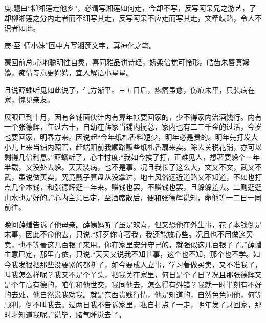 
\begin{parag}
    \begin{note}庚:题曰“柳湘莲走他乡”，必谓写湘莲如何走，今却不写，反写阿呆兄之游艺，了却柳湘莲之分内走者而不细写其走，反写阿呆不应走而写其走，文牵歧路，令人不识者如此。\end{note}
\end{parag}


\begin{parag}
    \begin{note}庚:至“情小妹”回中方写湘莲文字，真神化之笔。\end{note}
\end{parag}


\begin{parag}
    \begin{note}蒙回前总:心地聪明性自灵，喜同雅品讲诗经，娇柔倍觉可怜形。皓齿朱唇真嬝嬝，痴情专意更娉娉，宜人解语小星星。\end{note}
\end{parag}


\begin{parag}
    且说薛蟠听见如此说了，气方渐平。三五日后，疼痛虽愈，伤痕未平，只装病在家，愧见亲友。
\end{parag}


\begin{parag}
    展眼已到十月，因有各铺面伙计内有算年帐要回家的，少不得家内治酒饯行。内有一个张德辉，年过六十，自幼在薛家当铺内揽总，家内也有二三千金的过活，今岁也要回家，明春方来。因说起“今年纸札香料短少，明年必是贵的。明年先打发大小儿上来当铺内照管，赶端阳前我顺路贩些纸札香扇来卖。除去关税花销，亦可以剩得几倍利息。”薛蟠听了，心中忖度:“我如今挨了打，正难见人，想著要躲个一年半载，又没处去躲。天天装病，也不是事。况且我长了这么大，文又不文，武又不武，虽说做买卖，究竟戥子算盘从没拿过，地土风俗远近道路又不知道，不如也打点几个本钱，和张德辉逛一年来。赚钱也罢，不赚钱也罢，且躲躲羞去。二则逛逛山水也是好的。”心内主意已定，至酒席散后，便和张德辉说知，命他等一二日一同前往。
\end{parag}


\begin{parag}
    晚间薛蟠告诉了他母亲。薛姨妈听了虽是欢喜，但又恐他在外生事，花了本钱倒是末事，因此不命他去，只说:“好歹你守著我，我还能放心些。况且也不用做这买卖，也不等著这几百银子来用。你在家里安分守己的，就强似这几百银子了。”薛蟠主意已定，那里肯依，只说:“天天又说我不知世事，这个也不知，那个也不学。如今我发狠把那些没要紧的都断了，如今要成人立事，学习著做买卖，又不准我了，叫我怎么样呢？我又不是个丫头，把我关在家里，何日是个了日？况且那张德辉又是个年高有德的，咱们和他世交，我同他去，怎么得有舛错？我就一时半刻有不好的去处，他自然说我劝我。就是东西贵贱行情，他是知道的，自然色色问他，何等顺利，倒不叫我去。过两日我不告诉家里，私自打点了一走，明年发了财回家，那时才知道我呢。”说毕，赌气睡觉去了。
\end{parag}


